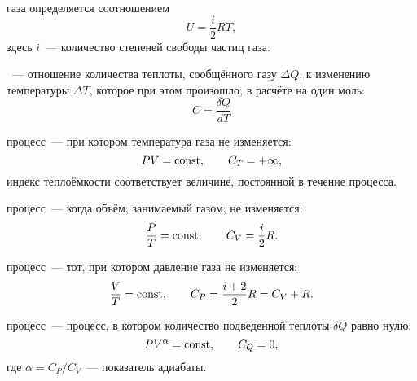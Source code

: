  газа определяется соотношением
\begin{equation}
U = \frac{i}{2}RT,
\end{equation}
здесь $i$~--- количество степеней свободы частиц газа.

~--- отношение количества теплоты, сообщённого газу $\Delta Q$, к изменению температуры $\Delta T$, которое при этом произошло, в расчёте на один моль:
\begin{equation}
C = \frac{\delta Q}{dT}
\end{equation} 

 процесс~--- при котором температура газа не изменяется:
\begin{equation}
PV = \operatorname{const}, \quad\quad C_T = +\infty,
\end{equation}
индекс теплоёмкости соответствует величине, постоянной в течение процесса.

 процесс~--- когда объём, занимаемый газом, не изменяется:
\begin{equation}
\frac{P}{T} = \operatorname{const}, \quad\quad C_V = \frac{i}{2}R.
\end{equation}

 процесс~--- тот, при котором давление газа не изменяется:
\begin{equation}
\frac{V}{T} = \operatorname{const}, \quad\quad C_P = \frac{i+2}{2}R = C_V + R.
\end{equation}

 процесс~--- процесс, в котором количество подведенной теплоты $\delta Q$ равно нулю:
\begin{equation}
P V^\alpha = \operatorname{const}, \quad\quad C_Q = 0,
\end{equation}
где $\alpha = C_P/C_V$~--- показатель адиабаты.
